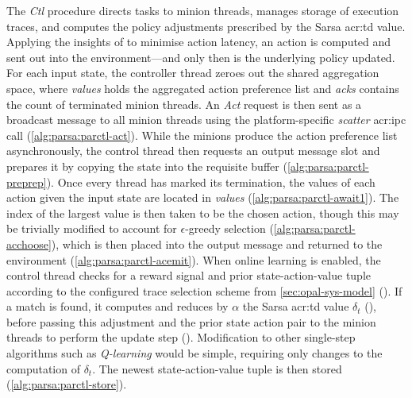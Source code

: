 The \emph{Ctl} procedure directs tasks to minion threads, manages storage of execution traces, and computes the policy adjustments prescribed by the Sarsa \gls{acr:td} value.
Applying the insights of \textcite{DBLP:journals/firai/TravnikMSP18} to minimise action latency, an action is computed and sent out into the environment---and only then is the underlying policy updated.
For each input state, the controller thread zeroes out the shared aggregation space, where \emph{values} holds the aggregated action preference list and \emph{acks} contains the count of terminated minion threads.
An \emph{Act} request is then sent as a broadcast message to all minion threads using the platform-specific \emph{scatter} \gls{acr:ipc} call (\cref{alg:parsa:parctl-act}).
While the minions produce the action preference list asynchronously, the control thread then requests an output message slot and prepares it by copying the state into the requisite buffer (\cref{alg:parsa:parctl-preprep}).
Once every thread has marked its termination, the values of each action given the input state are located in \emph{values} (\cref{alg:parsa:parctl-await1}).
The index of the largest value is then taken to be the chosen action, though this may be trivially modified to account for $\epsilon$-greedy selection (\cref{alg:parsa:parctl-acchoose}), which is then placed into the output message and returned to the environment (\cref{alg:parsa:parctl-acemit}).
When online learning is enabled, the control thread checks for a reward signal and prior state-action-value tuple according to the configured trace selection scheme from \cref{sec:opal-sys-model} ().
If a match is found, it computes and reduces by $\alpha$ the Sarsa \gls{acr:td} value $\delta_t$ (), before passing this adjustment and the prior state action pair to the minion threads to perform the update step ().
Modification to other single-step algorithms such as \emph{Q-learning} would be simple, requiring only changes to the computation of $\delta_t$.
The newest state-action-value tuple is then stored (\cref{alg:parsa:parctl-store}).

